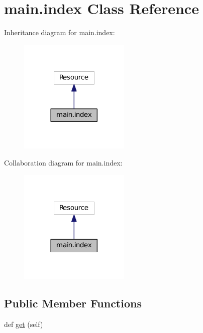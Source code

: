 \hypertarget{classmain_1_1index}{}\section{main.\+index Class Reference}
\label{classmain_1_1index}


Inheritance diagram for main.\+index\+:
\nopagebreak
\begin{figure}[H]
\begin{center}
\leavevmode
\includegraphics[width=149pt]{classmain_1_1index__inherit__graph}
\end{center}
\end{figure}


Collaboration diagram for main.\+index\+:
\nopagebreak
\begin{figure}[H]
\begin{center}
\leavevmode
\includegraphics[width=149pt]{classmain_1_1index__coll__graph}
\end{center}
\end{figure}
\subsection*{Public Member Functions}
\begin{DoxyCompactItemize}
\item 
def \hyperlink{classmain_1_1index_aef2fa413e56c3ba4b7d0088148aa8ae8}{get} (self)
\end{DoxyCompactItemize}


